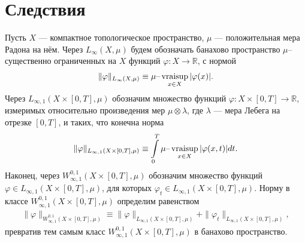 \documentclass{report}
\newcommand{\vraisup}{\mathop{\rm vraisup}}
\begin{document}
        \section{Следствия}
Пусть $X$ --- компактное топологическое пространство, $\mu$ --- положительная мера Радона на нём. Через $L_\infty(X,\mu)$ будем обозначать банахово пространство $\mu$--существенно
ограниченных на $X$ функций $\varphi\colon X\to\mathbb{R}$, с нормой
\begin{gather*}
\|\varphi\|_{L_\infty(X,\mu)}\equiv\mu\text{--}\vraisup_{x\in X}|\varphi(x)|.
\end{gather*}
Через $L_{\infty,1}(X\times[0,T],\mu)$ обозначим множество функций $\varphi\colon X\times[0,T]\to\mathbb{R}$, измеримых относительно произведения мер $\mu\otimes\lambda$, где
$\lambda$ --- мера Лебега на отрезке $[0,T]$, и таких, что конечна норма
\begin{gather*}
\|\varphi\|_{L_{\infty,1}(X\times[0,T],\mu)}\equiv\int\limits_0^T\mu\text{--}\vraisup_{x\in X}|\varphi(x,t)|dt.
\end{gather*}
Наконец, через $W^{0,1}_{\infty,1}(X\times[0,T],\mu)$ обозначим множество функций $\varphi\in L_{\infty,1}(X\times[0,T],\mu)$, для которых
$\varphi_t\in L_{\infty,1}(X\times[0,T],\mu)$. Норму в классе $W^{0,1}_{\infty,1}(X\times[0,T],\mu)$ определим равенством
\begin{gather*}
\|\varphi\|_{W^{0,1}_{\infty,1}(X\times[0,T],\mu)}\equiv \|\varphi\|_{L_{\infty,1}(X\times[0,T],\mu)}+\|\varphi_t\|_{L_{\infty,1}(X\times[0,T],\mu)},
\end{gather*}
превратив тем самым класс $W^{0,1}_{\infty,1}(X\times[0,T],\mu)$ в банахово пространство.
\end{document}
